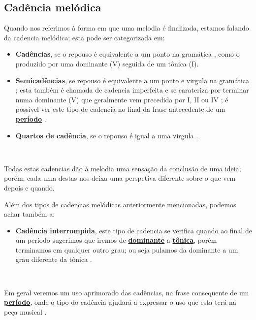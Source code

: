 \subsection{Cadência melódica} 
\label{subsec:cadenciamelodica}
Quando nos referimos à forma em que uma melodia é finalizada,
estamos falando da cadencia melódica; esta pode ser categorizada em: 
\begin{itemize}
\item \textbf{Cadências}, se o repouso é equivalente a um ponto na gramática \cite[pp. 66,67]{melcior1859diccionario},
como o produzido por uma dominante (V) seguida de um tônica (I).
\item \textbf{Semicadências}, se repouso é equivalente a um ponto e virgula na gramática \cite[pp. 66,67]{melcior1859diccionario};
esta também é chamada de cadencia imperfeita e se carateriza por terminar numa dominante (V) 
que geralmente vem precedida por  I, II ou IV \cite[pp. 103]{grabner2001teoria}; 
é possível ver este tipo de cadencia no final da frase antecedente de um 
\hyperref[sec:Periodo]{\textbf{período}} \cite[pp. 21]{latham2008diccionario}.
\item \textbf{Quartos de cadência}, se o repouso é igual a uma virgula \cite[pp. 66,67]{melcior1859diccionario}.
\end{itemize}~

Todas estas cadencias dão à melodia uma sensação da conclusão de uma ideia; 
porém, cada uma destas nos deixa uma perspetiva diferente sobre o que vem depois e quando.

Além dos tipos de cadencias melódicas anteriormente mencionadas, podemos achar também a:
\begin{itemize}
\item \textbf{Cadência interrompida}, este tipo de cadencia se verifica 
quando ao final de um período sugerimos que iremos de 
\hyperref[sec:dominante]{\textbf{dominante}} a \hyperref[sec:Tonica]{\textbf{tônica}},
porém terminamos em qualquer outro grau; ou seja pulamos da dominante a um grau diferente da tônica 
\cite[pp. 67]{melcior1859diccionario} \cite[pp. 60]{pedrell2009diccionario}. 
\end{itemize}~

Em geral veremos um uso aprimorado das cadências, na frase consequente de um \hyperref[sec:Periodo]{\textbf{período}},
onde o tipo do cadência ajudará a expressar o uso que esta terá na peça musical  \cite[pp. 66,67]{melcior1859diccionario}.

